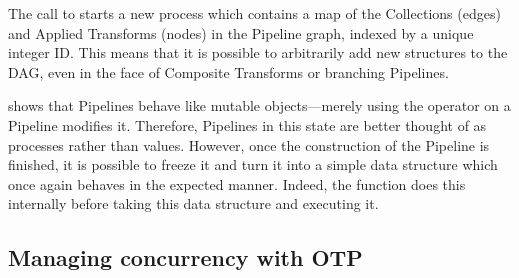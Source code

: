 
The call to  starts a new process which contains a map of the Collections (edges) and Applied Transforms (nodes) in the Pipeline graph, indexed by a unique integer ID.
This means that it is possible to arbitrarily add new structures to the DAG, even in the face of Composite Transforms or branching Pipelines.


 shows that Pipelines behave like mutable objects---merely using the \exs{~>} operator on a Pipeline modifies it.
Therefore, Pipelines in this state are better thought of as processes rather than values.
However, once the construction of the Pipeline is finished, it is possible to freeze it and turn it into a simple data structure which once again behaves in the expected manner.
Indeed, the  function does this internally before taking this data structure and executing it.

\subsection{Managing concurrency with OTP}\label{sec:impl:approach:concurrency}


